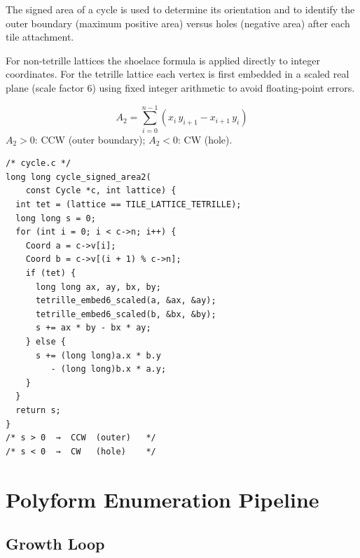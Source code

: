 \documentclass[10pt,a4paper]{article}
\let\polysection\section
\renewcommand\section{\needspace{0.16\textheight}\polysection}
\let\polysubsection\subsection
\renewcommand\subsection{\needspace{0.12\textheight}\polysubsection}
\newcommand{\file}[1]{\texttt{\footnotesize #1}}
\begin{document}
\begin{tcolorbox}[dualbox, title=Shoelace Formula — \file{src/core/cycle.c}]
  The signed area of a cycle is used to determine its orientation and
  to identify the outer boundary (maximum positive area) versus holes
  (negative area) after each tile attachment.

  For non-tetrille lattices the shoelace formula is applied directly
  to integer coordinates.  For the tetrille lattice each vertex is
  first embedded in a scaled real plane (scale factor 6) using fixed
  integer arithmetic to avoid floating-point errors.

  \[
    A_2 = \sum_{i=0}^{n-1} (x_i \, y_{i+1} - x_{i+1} \, y_i)
  \]
  $A_2 > 0$: CCW (outer boundary); \;
  $A_2 < 0$: CW (hole).
\tcblower
\begin{verbatim}
/* cycle.c */
long long cycle_signed_area2(
    const Cycle *c, int lattice) {
  int tet = (lattice == TILE_LATTICE_TETRILLE);
  long long s = 0;
  for (int i = 0; i < c->n; i++) {
    Coord a = c->v[i];
    Coord b = c->v[(i + 1) % c->n];
    if (tet) {
      long long ax, ay, bx, by;
      tetrille_embed6_scaled(a, &ax, &ay);
      tetrille_embed6_scaled(b, &bx, &by);
      s += ax * by - bx * ay;
    } else {
      s += (long long)a.x * b.y
         - (long long)b.x * a.y;
    }
  }
  return s;
}
/* s > 0  →  CCW  (outer)   */
/* s < 0  →  CW   (hole)    */
\end{verbatim}
\end{tcolorbox}

\section{Polyform Enumeration Pipeline}

\subsection{Growth Loop}
\end{document}
